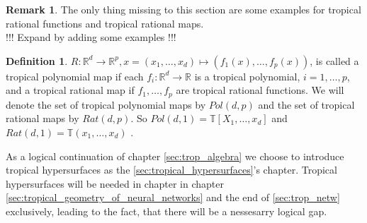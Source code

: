 \documentclass{article}
\theoremstyle{definition}
\newtheorem{definition}[theorem]{Definition}
\newtheorem{remark}[theorem]{Remark}
\begin{document}
\begin{remark}
The only thing missing to this section are some examples for tropical rational functions and tropical rational maps. \\
!!! Expand by adding some examples !!!
\end{remark}

\begin{definition}
$R : \mathbb{R}^{d} \to \mathbb{R}^{p}, x = (x_1, \dots , x_d)\mapsto (f_1(x), \dots , f_p(x))$, is called a tropical polynomial map if each $f_i : \mathbb{R}^{d} \to \mathbb{R}$ is a tropical polynomial, $i = 1, \dots , p$, and a tropical rational map if $f_1, \dots , f_p$ are tropical rational functions. We will denote the set of tropical polynomial maps by $Pol(d, p)$ and the set of tropical rational maps by $Rat(d, p)$. So $Pol(d, 1) = \mathbb{T}[X_1, \dots , x_d]$ and $Rat(d, 1) = \mathbb{T}(x_1, \dots , x_d)$ \cite[p.~3]{zhang2018tropical}.
\end{definition}

As a logical continuation of chapter \ref{sec:trop_algebra} we choose to introduce tropical hypersurfaces as the \ref{sec:tropical_hypersurfaces}'s chapter. Tropical hypersurfaces will be needed in chapter in chapter \ref{sec:tropical_geometry_of_neural_networks} and the end of \ref{sec:trop_netw} exclusively, leading to the fact, that there will be a nessesarry logical gap.

\newpage
\end{document}
